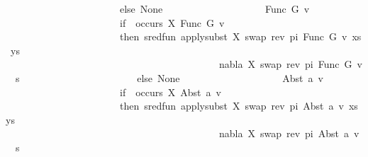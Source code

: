 \begin{isabellebody}
\ \ \ \ \ \ \ \ \ \ \ \ \ \ \ \ \ \ \ \ \ \ \ else\ None\isanewline
\ \ \ \ \ \ \ \ \ \ \ \ \ \ \ \ \ \ \ {\isacharbar}{\kern0pt}\ Func\ G\ v\ {\isasymRightarrow}\isanewline
\ \ \ \ \ \ \ \ \ \ \ \ \ \ \ \ \ \ \ \ \ \ \ if\ {\isasymnot}\ occurs\ X\ {\isacharparenleft}{\kern0pt}Func\ G\ v{\isacharparenright}{\kern0pt}\isanewline
\ \ \ \ \ \ \ \ \ \ \ \ \ \ \ \ \ \ \ \ \ \ \ then\ sred{\isacharunderscore}{\kern0pt}fun\ {\isacharparenleft}{\kern0pt}apply{\isacharunderscore}{\kern0pt}subst\ {\isacharbrackleft}{\kern0pt}{\isacharparenleft}{\kern0pt}X{\isacharcomma}{\kern0pt}\ swap\ {\isacharparenleft}{\kern0pt}rev\ pi{\isacharparenright}{\kern0pt}\ {\isacharparenleft}{\kern0pt}Func\ G\ v{\isacharparenright}{\kern0pt}{\isacharparenright}{\kern0pt}{\isacharbrackright}{\kern0pt}\ {\isacharparenleft}{\kern0pt}xs{\isacharcomma}{\kern0pt}\ ys{\isacharparenright}{\kern0pt}{\isacharcomma}{\kern0pt}\isanewline
\ \ \ \ \ \ \ \ \ \ \ \ \ \ \ \ \ \ \ \ \ \ \ \ \ \ \ \ \ \ \ \ \ \ \ \ \ \ \ \ \ \ \ nabla{\isacharcomma}{\kern0pt}\ {\isacharbrackleft}{\kern0pt}{\isacharparenleft}{\kern0pt}X{\isacharcomma}{\kern0pt}\ swap\ {\isacharparenleft}{\kern0pt}rev\ pi{\isacharparenright}{\kern0pt}\ {\isacharparenleft}{\kern0pt}Func\ G\ v{\isacharparenright}{\kern0pt}{\isacharparenright}{\kern0pt}{\isacharbrackright}{\kern0pt}\ {\isasymbullet}\ s{\isacharparenright}{\kern0pt}\isanewline
\ \ \ \ \ \ \ \ \ \ \ \ \ \ \ \ \ \ \ \ \ \ \ else\ None\isanewline
\ \ \ \ \ \ \ \ \ \ \ \ \ \ \ \ \ \ \ {\isacharbar}{\kern0pt}\ Abst\ a\ v\ {\isasymRightarrow}\isanewline
\ \ \ \ \ \ \ \ \ \ \ \ \ \ \ \ \ \ \ \ \ \ \ if\ {\isasymnot}\ occurs\ X\ {\isacharparenleft}{\kern0pt}Abst\ a\ v{\isacharparenright}{\kern0pt}\isanewline
\ \ \ \ \ \ \ \ \ \ \ \ \ \ \ \ \ \ \ \ \ \ \ then\ sred{\isacharunderscore}{\kern0pt}fun\ {\isacharparenleft}{\kern0pt}apply{\isacharunderscore}{\kern0pt}subst\ {\isacharbrackleft}{\kern0pt}{\isacharparenleft}{\kern0pt}X{\isacharcomma}{\kern0pt}\ swap\ {\isacharparenleft}{\kern0pt}rev\ pi{\isacharparenright}{\kern0pt}\ {\isacharparenleft}{\kern0pt}Abst\ a\ v{\isacharparenright}{\kern0pt}{\isacharparenright}{\kern0pt}{\isacharbrackright}{\kern0pt}\ {\isacharparenleft}{\kern0pt}xs{\isacharcomma}{\kern0pt}\ ys{\isacharparenright}{\kern0pt}{\isacharcomma}{\kern0pt}\isanewline
\ \ \ \ \ \ \ \ \ \ \ \ \ \ \ \ \ \ \ \ \ \ \ \ \ \ \ \ \ \ \ \ \ \ \ \ \ \ \ \ \ \ \ nabla{\isacharcomma}{\kern0pt}\ {\isacharbrackleft}{\kern0pt}{\isacharparenleft}{\kern0pt}X{\isacharcomma}{\kern0pt}\ swap\ {\isacharparenleft}{\kern0pt}rev\ pi{\isacharparenright}{\kern0pt}\ {\isacharparenleft}{\kern0pt}Abst\ a\ v{\isacharparenright}{\kern0pt}{\isacharparenright}{\kern0pt}{\isacharbrackright}{\kern0pt}\ {\isasymbullet}\ s{\isacharparenright}{\kern0pt}\isanewline

\end{isabellebody}
